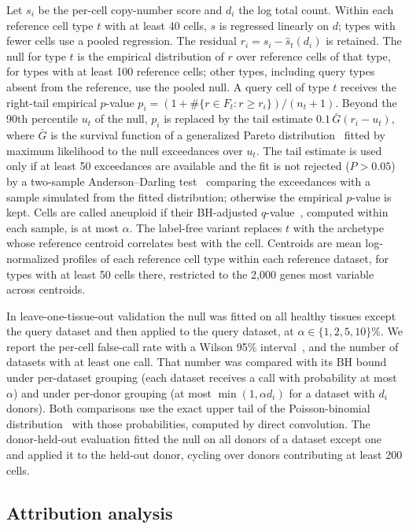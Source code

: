 \documentclass[11pt,letterpaper]{article}
\begin{document}
Let $s_i$ be the per-cell copy-number score and $d_i$ the log total count. Within each reference cell type $t$ with at least 40 cells, $s$ is regressed linearly on $d$; types with fewer cells use a pooled regression. The residual $r_i = s_i - \hat{s}_t(d_i)$ is retained. The null for type $t$ is the empirical distribution of $r$ over reference cells of that type, for types with at least 100 reference cells; other types, including query types absent from the reference, use the pooled null. A query cell of type $t$ receives the right-tail empirical $p$-value $p_i = (1 + \#\{r \in F_t : r \ge r_i\}) / (n_t + 1)$. Beyond the 90th percentile $u_t$ of the null, $p_i$ is replaced by the tail estimate $0.1\,\bar{G}(r_i - u_t)$, where $\bar{G}$ is the survival function of a generalized Pareto distribution~\cite{pickands1975,knijnenburg2009} fitted by maximum likelihood to the null exceedances over $u_t$. The tail estimate is used only if at least 50 exceedances are available and the fit is not rejected ($P > 0.05$) by a two-sample Anderson--Darling test~\cite{scholz1987} comparing the exceedances with a sample simulated from the fitted distribution; otherwise the empirical $p$-value is kept. Cells are called aneuploid if their BH-adjusted $q$-value~\cite{bh1995}, computed within each sample, is at most $\alpha$. The label-free variant replaces $t$ with the archetype whose reference centroid correlates best with the cell. Centroids are mean log-normalized profiles of each reference cell type within each reference dataset, for types with at least 50 cells there, restricted to the 2{,}000 genes most variable across centroids.

In leave-one-tissue-out validation the null was fitted on all healthy tissues except the query dataset and then applied to the query dataset, at $\alpha \in \{1, 2, 5, 10\}\%$. We report the per-cell false-call rate with a Wilson 95\% interval~\cite{wilson1927}, and the number of datasets with at least one call. That number was compared with its BH bound under per-dataset grouping (each dataset receives a call with probability at most $\alpha$) and under per-donor grouping (at most $\min(1, \alpha d_i)$ for a dataset with $d_i$ donors). Both comparisons use the exact upper tail of the Poisson-binomial distribution~\cite{hong2013} with those probabilities, computed by direct convolution. The donor-held-out evaluation fitted the null on all donors of a dataset except one and applied it to the held-out donor, cycling over donors contributing at least 200 cells.

\subsection{Attribution analysis}
\end{document}
